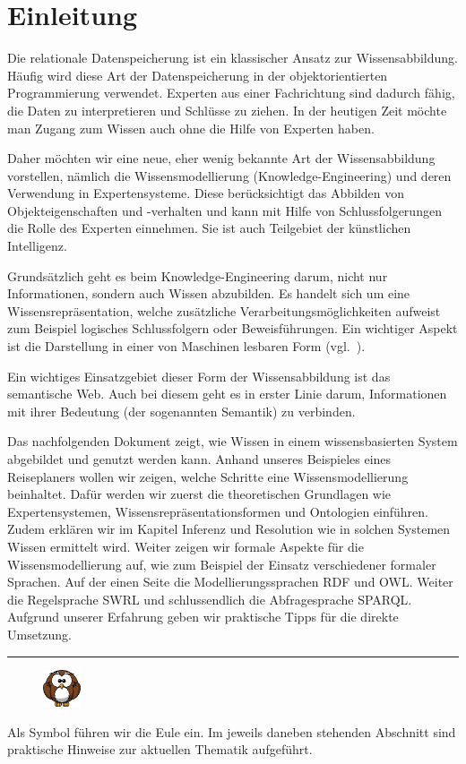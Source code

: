 \chapter{Einleitung}
\label{chap:einleitung}
Die relationale Datenspeicherung ist ein klassischer Ansatz zur Wissensabbildung. Häufig wird diese Art der Datenspeicherung in der objektorientierten Programmierung verwendet. Experten aus einer Fachrichtung sind dadurch fähig, die Daten zu interpretieren und Schlüsse zu ziehen. In der heutigen Zeit möchte man Zugang zum Wissen auch ohne die Hilfe von Experten haben. 

Daher möchten wir eine neue, eher wenig bekannte Art der Wissensabbildung vorstellen, nämlich die Wissensmodellierung (Knowledge-Engineering) und deren Verwendung in Expertensysteme. Diese berücksichtigt das Abbilden von Objekteigenschaften und -verhalten und kann mit Hilfe von Schlussfolgerungen die Rolle des Experten einnehmen. Sie ist auch Teilgebiet der künstlichen Intelligenz.

Grundsätzlich geht es beim Knowledge-Engineering darum, nicht nur Informationen, sondern auch Wissen abzubilden. Es handelt sich um eine Wissensrepräsentation, welche zusätzliche Verarbeitungsmöglichkeiten aufweist zum Beispiel logisches Schlussfolgern oder Beweisführungen. Ein wichtiger Aspekt ist die Darstellung in einer von Maschinen lesbaren Form (vgl.~\cite[S. 308]{ISpekOntoGeschichte}).

Ein wichtiges Einsatzgebiet dieser Form der Wissensabbildung ist das semantische Web. Auch bei diesem geht es in erster Linie darum, Informationen mit ihrer Bedeutung (der sogenannten Semantik) zu verbinden.

Das nachfolgenden Dokument zeigt, wie Wissen in einem wissensbasierten System abgebildet und genutzt werden kann. Anhand unseres Beispieles eines Reiseplaners wollen wir zeigen, welche Schritte eine Wissensmodellierung beinhaltet. Dafür werden wir zuerst die theoretischen Grundlagen wie Expertensystemen, Wissensrepräsentationsformen und Ontologien einführen. Zudem erklären wir im Kapitel Inferenz und Resolution wie in solchen Systemen Wissen ermittelt wird. Weiter zeigen wir formale Aspekte für die Wissensmodellierung auf, wie zum Beispiel der Einsatz verschiedener formaler Sprachen. Auf der einen Seite die Modellierungssprachen RDF und OWL. Weiter die Regelsprache SWRL und schlussendlich die Abfragesprache SPARQL. Aufgrund unserer Erfahrung geben wir praktische Tipps für die direkte Umsetzung.

\noindent\rule[1ex]{\textwidth}{1pt}
\begin{figure}
    \vspace{-12pt}
    \includegraphics[width=0.1\textwidth]{bilder/owl.png}\protect\footnotemark{}
\end{figure}
Als Symbol führen wir die Eule ein. Im jeweils daneben stehenden Abschnitt sind praktische Hinweise zur aktuellen Thematik aufgeführt.

